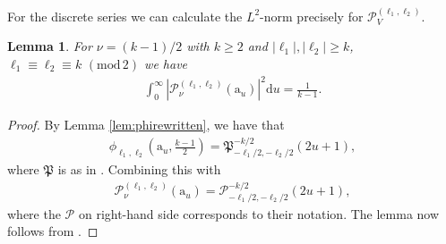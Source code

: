 \documentclass[12pt]{amsart}
\newtheorem{lemma}[theorem]{Lemma}
\theoremstyle{definition}
\theoremstyle{remark}
\numberwithin{equation}{section}
\newcommand{\PP}{\mathcal{P}}
\newcommand{\1}{{\mathbf 1}}
\renewcommand{\a}{\mathrm{a}}
\renewcommand{\d}{\mathrm d}
\renewcommand{\pmod}[1]{\,\,(\mathrm{mod}\,{#1})}
\begin{document}
For the discrete series we can calculate the $L^2$-norm precisely  for  $\mathcal{P}_V^{(\ell_1,\ell_2)}$.  
\begin{lemma} \label{le:orthogonpol}
 For $\nu=(k-1)/2$ with $k \geq 2$ and $|\ell_1|,|\ell_2| \geq k$, $\ell_1 \equiv \ell_2 \equiv k \pmod{2}$ we have
  \begin{align*}
    \int_0^\infty  |\mathcal{P}^{(\ell_1,\ell_2)}_{\nu}(\a_u)|^2 \d u = \frac{1}{k-1}. 
  \end{align*}
\end{lemma}
\begin{proof}
    By Lemma \ref{lem:phirewritten}, we have that
    \begin{align*}
        \phi_{\ell_1,\ell_2}(\a_u,\tfrac{k-1}{2})=\mathfrak{P}^{-k/2}_{-\ell_1/2,-\ell_2/2}(2u+1),
    \end{align*}
    where $\mathfrak{P}$ is as in \cite[sec. 6.5.4 eq. (1)]{liegroupbook}. Combining this with \cite[sec. 6.5.6 eqs. (8), (8')]{liegroupbook} 
    \begin{align*}
        \PP_{\nu}^{(\ell_1,\ell_2)}(\a_u) = \PP^{-k/2}_{-\ell_1/2,-\ell_2/2}(2u+1),
    \end{align*}
where the $\PP$ on right-hand side corresponds to their notation. The lemma now follows from \cite[sec. 7.8.4 eq. (12)]{liegroupbook}.
\end{proof}
\end{document}
